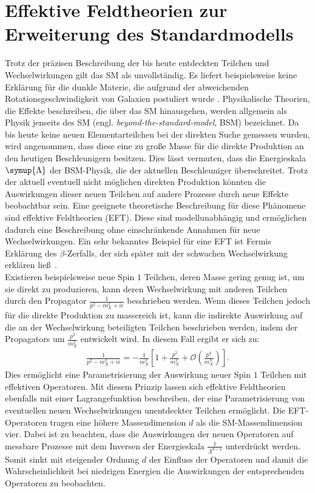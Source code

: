\section{Effektive Feldtheorien zur Erweiterung des Standardmodells}
Trotz der präzisen Beschreibung der bis heute entdeckten Teilchen und Wechselwirkungen gilt das SM als unvollständig. Es liefert beispielsweise keine Erklärung für die dunkle Materie, die aufgrund der abweichenden Rotationsgeschwindigkeit von Galaxien postuliert wurde \cite{Bertone:2016nfn}. Physikalische Theorien, die Effekte beschreiben, die über das SM hinausgehen, werden allgemein als Physik jenseits des SM (engl. \textit{beyond-the-standard-model}, BSM) bezeichnet. Da bis heute keine neuen Elementarteilchen bei der direkten Suche gemessen wurden, wird angenommen, dass diese eine zu große Masse für die direkte Produktion an den heutigen Beschleunigern besitzen. Dies lässt vermuten, dass die Energieskala $\symup{\Lambda}$ der BSM-Physik, die der aktuellen Beschleuniger überschreitet. Trotz der aktuell eventuell nicht möglichen direkten Produktion könnten die Auswirkungen dieser neuen Teilchen auf andere Prozesse durch neue Effekte beobachtbar sein. Eine geeignete theoretische Beschreibung für diese Phänomene sind effektive Feldtheorien (EFT). Diese sind modellunabhängig und ermöglichen dadurch eine Beschreibung ohne einschränkende Annahmen für neue Wechselwirkungen. Ein sehr bekanntes Beispiel für eine EFT ist Fermis Erklärung des $\beta$-Zerfalls, der sich später mit der schwachen Wechselwirkung erklären ließ~\cite{Fermi1934}.\\
Existieren beispielsweise neue Spin $1$ Teilchen, deren Masse gering genug ist, um sie direkt zu produzieren, kann deren Wechselwirkung mit anderen Teilchen durch den Propagator $\frac{1}{p^2 -m_X^2+i\epsilon}$ beschrieben werden. Wenn dieses Teilchen jedoch für die direkte Produktion zu massereich ist, kann die indirekte Auswirkung auf die an der Wechselwirkung beteiligten Teilchen beschrieben werden, indem der Propagators um $\frac{p^2}{m_X^2}$ entwickelt wird. In diesem Fall ergibt er sich zu:
\begin{align}
    \frac{1}{p^2 -m_X^2 + i\epsilon} = -\frac{1}{m_X^2}\left[ 1 + \frac{p^2}{m_X^2} + \mathcal{O}\left(\frac{p^4}{m_X^4}\right)\right].
\end{align}
Dies ermöglicht eine Parametrisierung der Auswirkung neuer Spin $1$ Teilchen mit effektiven Operatoren.
Mit diesem Prinzip lassen sich effektive Feldtheorien ebenfalls mit einer Lagrangefunktion beschreiben, der eine Parametrisierung von eventuellen neuen Wechselwirkungen unentdeckter Teilchen ermöglicht. Die EFT-Operatoren tragen eine höhere Massendimension $d$ als die SM-Massendimension vier. Dabei ist zu beachten, dass die Auswirkungen der neuen Operatoren auf messbare Prozesse mit dem Inversen der Energieskala $\frac{1}{\Lambda^{d-4}}$ unterdrückt werden.  Somit sinkt mit steigender Ordnung $d$ der Einfluss der Operatoren und damit die Wahrscheinlichkeit bei niedrigen Energien die Auswirkungen der entsprechenden Operatoren zu beobachten.\\
